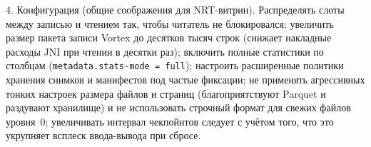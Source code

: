 4. Конфигурация (общие соображения для NRT-витрин). Распределять слоты
между записью и чтением так, чтобы читатель не блокировался; увеличить размер
пакета записи Vortex до десятков тысяч строк (снижает накладные расходы JNI при
чтении в десятки раз); включить полные статистики по столбцам
(\texttt{metadata.stats-mode = full}); настроить расширенные политики хранения
снимков и манифестов под частые фиксации; не применять агрессивных тонких
настроек размера файлов и страниц (благоприятствуют Parquet и раздувают
хранилище) и не использовать строчный формат для свежих файлов уровня~0;
увеличивать интервал чекпойнтов следует с учётом того, что это укрупняет всплеск
ввода-вывода при сбросе.
